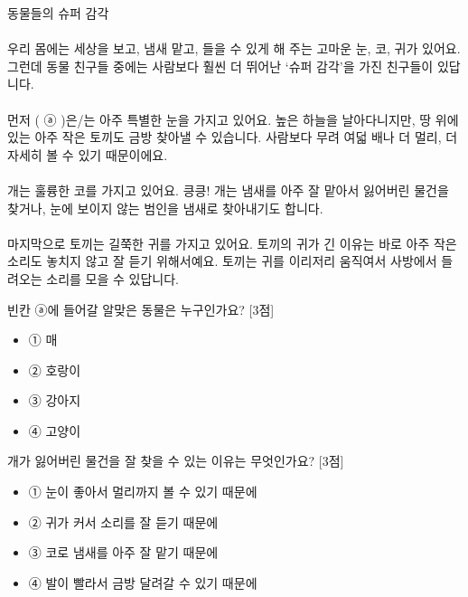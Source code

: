 \documentclass[12pt,a4paper]{article}
\newcommand{\qnum}[1]{%
  \tikz[baseline=(num.base)]{%
    \node[circle, fill=numCircle, text=white, inner sep=0pt,
          minimum size=18pt, font=\small\bfseries] (num) {#1};%
  }%
}
\newcommand{\pts}[1]{%
  \hfill\textcolor{ptsBadge}{[#1점]}%
}
\begin{document}
\begin{samepage}
\vspace{4mm}
\begin{tcolorbox}[passage]
동물들의 슈퍼 감각 \\{}
\vspace{4pt} \\{}
우리 몸에는 세상을 보고, 냄새 맡고, 들을 수 있게 해 주는 고마운 눈, 코, 귀가 있어요. 그런데 동물 친구들 중에는 사람보다 훨씬 더 뛰어난 ‘슈퍼 감각’을 가진 친구들이 있답니다. \\{}
\vspace{4pt} \\{}
먼저 ( ⓐ )은/는 아주 특별한 눈을 가지고 있어요. 높은 하늘을 날아다니지만, 땅 위에 있는 아주 작은 토끼도 금방 찾아낼 수 있습니다. 사람보다 무려 여덟 배나 더 멀리, 더 자세히 볼 수 있기 때문이에요. \\{}
\vspace{4pt} \\{}
개는 훌륭한 코를 가지고 있어요. 킁킁! 개는 냄새를 아주 잘 맡아서 잃어버린 물건을 찾거나, 눈에 보이지 않는 범인을 냄새로 찾아내기도 합니다. \\{}
\vspace{4pt} \\{}
마지막으로 토끼는 길쭉한 귀를 가지고 있어요. 토끼의 귀가 긴 이유는 바로 아주 작은 소리도 놓치지 않고 잘 듣기 위해서예요. 토끼는 귀를 이리저리 움직여서 사방에서 들려오는 소리를 모을 수 있답니다.
\end{tcolorbox}
\vspace{3mm}
\qnum{6}\enspace 빈칸 ⓐ에 들어갈 알맞은 동물은 누구인가요? \pts{3}

\vspace{3mm}
\begin{itemize}[leftmargin=1.5em, labelsep=0pt, label={}, itemsep=2pt, parsep=0pt]
  \item ① 매
  \item ② 호랑이
  \item ③ 강아지
  \item ④ 고양이
\end{itemize}
\end{samepage}

\begin{samepage}
\vspace{4mm}
\qnum{7}\enspace 개가 잃어버린 물건을 잘 찾을 수 있는 이유는 무엇인가요? \pts{3}

\vspace{3mm}
\begin{itemize}[leftmargin=1.5em, labelsep=0pt, label={}, itemsep=2pt, parsep=0pt]
  \item ① 눈이 좋아서 멀리까지 볼 수 있기 때문에
  \item ② 귀가 커서 소리를 잘 듣기 때문에
  \item ③ 코로 냄새를 아주 잘 맡기 때문에
  \item ④ 발이 빨라서 금방 달려갈 수 있기 때문에
\end{itemize}
\end{samepage}
\end{document}
